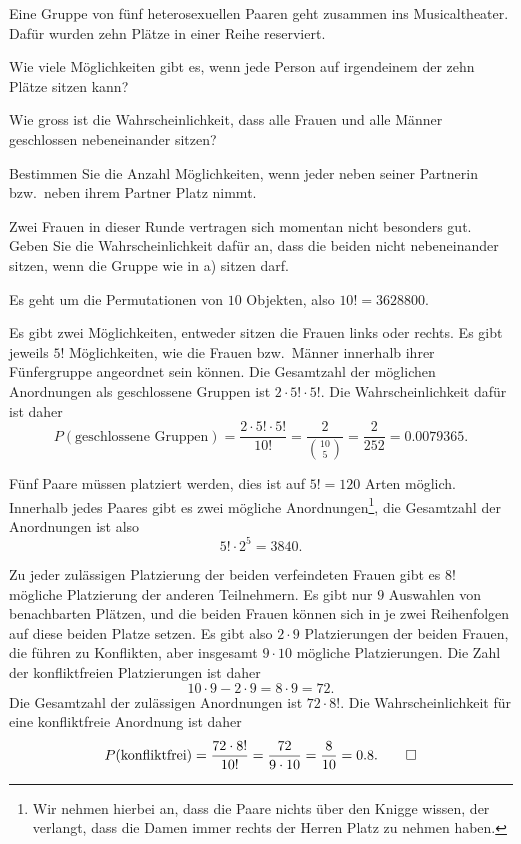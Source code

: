 Eine Gruppe von fünf heterosexuellen Paaren geht zusammen ins Musicaltheater.
Dafür wurden zehn Plätze in einer Reihe reserviert.
\begin{teilaufgaben}
\item
Wie viele Möglichkeiten gibt es, wenn jede Person auf irgendeinem
der zehn Plätze sitzen kann?
\item 
Wie gross ist die Wahrscheinlichkeit, dass alle Frauen und alle Männer
geschlossen nebeneinander sitzen?
\item
Bestimmen Sie die Anzahl Möglichkeiten, wenn jeder neben seiner Partnerin
bzw.~neben ihrem Partner Platz nimmt.
\item
Zwei Frauen in dieser Runde vertragen sich momentan nicht besonders gut.
Geben Sie die Wahrscheinlichkeit dafür an, dass die beiden nicht 
nebeneinander sitzen, wenn die Gruppe wie in a) sitzen
darf.
\end{teilaufgaben}


\begin{loesung}
\begin{teilaufgaben}
\item
Es geht um die Permutationen von $10$ Objekten, also $10!=3628800$.
\item
Es gibt zwei Möglichkeiten, entweder sitzen die Frauen links oder rechts.
Es gibt jeweils $5!$ Möglichkeiten, wie die Frauen bzw.~Männer innerhalb
ihrer Fünfergruppe angeordnet sein können. Die Gesamtzahl der möglichen
Anordnungen als geschlossene Gruppen ist $2\cdot 5!\cdot 5!$.
Die Wahrscheinlichkeit dafür ist daher
\[
P(\text{geschlossene Gruppen})
=
\frac{2\cdot 5!\cdot 5!}{10!}
=
\frac{2}{\binom{10}{5}}
=\frac2{252}=0.0079365.
\]
\item
Fünf Paare müssen platziert werden, dies ist auf $5!=120$ Arten
möglich.
Innerhalb jedes Paares gibt es zwei mögliche Anordnungen\footnote{Wir nehmen
hierbei an, dass die Paare nichts über den Knigge wissen, der verlangt,
dass die Damen immer rechts der Herren Platz zu nehmen haben.}, die
Gesamtzahl der Anordnungen ist also
\[
5!\cdot 2^5=3840.
\]
\item
Zu jeder zulässigen Platzierung der beiden verfeindeten Frauen gibt es
$8!$ mögliche Platzierung der anderen Teilnehmern.
Es gibt nur $9$ Auswahlen von benachbarten Plätzen, und die beiden
Frauen können sich in je zwei Reihenfolgen auf diese beiden Platze
setzen.
Es gibt also $2\cdot 9$ Platzierungen
der beiden Frauen, die führen zu Konflikten,
aber insgesamt $9\cdot 10$ mögliche Platzierungen.
Die Zahl der konfliktfreien Platzierungen ist daher
\[
10\cdot 9-2\cdot 9= 8\cdot 9 = 72.
\]
Die Gesamtzahl der zulässigen Anordnungen ist $72\cdot 8!$.
Die Wahrscheinlichkeit für eine konfliktfreie Anordnung ist daher
\[
P(\text{konfliktfrei}) = \frac{72\cdot 8!}{10!}=\frac{72}{9\cdot 10}
=\frac{8}{10}=0.8.
\qedhere
\]
\end{teilaufgaben}
\end{loesung}

